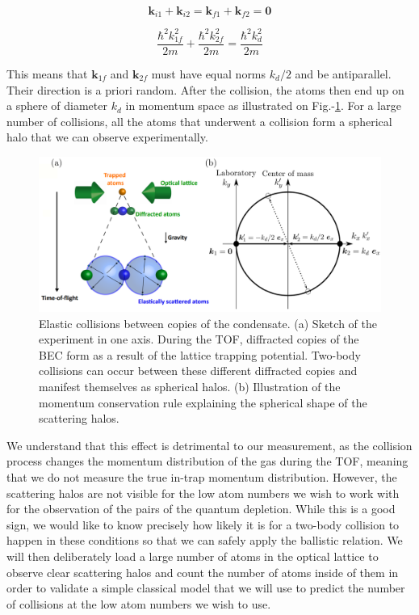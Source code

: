\begin{equation}
    \bm{k}_{i1}+\bm{k}_{i2}=\bm{k}_{f1}+\bm{k}_{f2}=\bm{0}
\end{equation}

\begin{equation}
    \frac{\hbar^2 k^2_{1f}}{2m} + \frac{\hbar^2 k^2_{2f}}{2m} =  \frac{\hbar^2 k_d^2}{2m}
\end{equation}

\noindent This means that $\bm{k}_{1f}$ and $\bm{k}_{2f}$ must have equal norms $k_d/2$ and be antiparallel. Their direction is a priori random. After the collision, the atoms then end up on a sphere of diameter $k_d$ in momentum space as illustrated on Fig.-\ref{fig:schema_collisions}. For a large number of collisions, all the atoms that underwent a collision form a spherical halo that we can observe experimentally.

\begin{figure}[ht!]
    \centering
    \includegraphics[width=\textwidth]{Fig/Chapter3/schema_collisions.png}
    \caption[Elastic collisions between copies of the condensate]{Elastic collisions between copies of the condensate. (a) Sketch of the experiment in one axis. During the TOF, diffracted copies of the BEC form as a result of the lattice trapping potential. Two-body collisions can occur between these different diffracted copies and manifest themselves as spherical halos. (b) Illustration of the momentum conservation rule explaining the spherical shape of the scattering halos.}
    \label{fig:schema_collisions}
\end{figure}

We understand that this effect is detrimental to our measurement, as the collision process changes the momentum distribution of the gas during the TOF, meaning that we do not measure the true in-trap momentum distribution. However, the scattering halos are not visible for the low atom numbers we wish to work with for the observation of the \kmk pairs of the quantum depletion. While this is a good sign, we would like to know precisely how likely it is for a two-body collision to happen in these conditions so that we can safely apply the ballistic relation. We will then deliberately load a large number of atoms in the optical lattice to observe clear scattering halos and count the number of atoms inside of them in order to validate a simple classical model that we will use to predict the number of collisions at the low atom numbers we wish to use.

